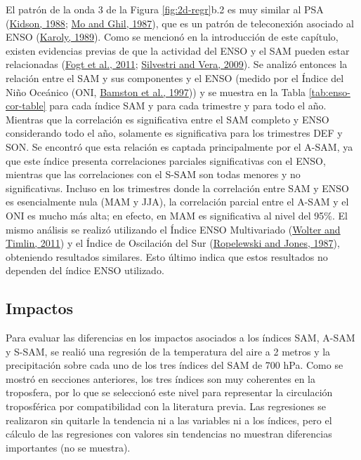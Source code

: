 \documentclass[12pt,oneside,a4paper]{reedthesis}
\begin{document}
El patrón de la onda 3 de la Figura \ref{fig:2d-regr}b.2 es muy similar al PSA (\protect\hyperlink{ref-kidson1988}{Kidson, 1988}; \protect\hyperlink{ref-mo1987}{Mo and Ghil, 1987}), que es un patrón de teleconexión asociado al ENSO (\protect\hyperlink{ref-karoly1989}{Karoly, 1989}).
Como se mencionó en la introducción de este capítulo, existen evidencias previas de que la actividad del ENSO y el SAM pueden estar relacionadas (\protect\hyperlink{ref-fogt2011a}{Fogt et al., 2011}; \protect\hyperlink{ref-silvestri2009}{Silvestri and Vera, 2009}).
Se analizó entonces la relación entre el SAM y sus componentes y el ENSO (medido por el Índice del Niño Oceánico (ONI, \protect\hyperlink{ref-bamston1997}{Bamston et al., 1997})) y se muestra en la Tabla \ref{tab:enso-cor-table} para cada índice SAM y para cada trimestre y para todo el año.
Mientras que la correlación es significativa entre el SAM completo y ENSO considerando todo el año, solamente es significativa para los trimestres DEF y SON.
Se encontró que esta relación es captada principalmente por el A-SAM, ya que este índice presenta correlaciones parciales significativas con el ENSO, mientras que las correlaciones con el S-SAM son todas menores y no significativas.
Incluso en los trimestres donde la correlación entre SAM y ENSO es esencialmente nula (MAM y JJA), la correlación parcial entre el A-SAM y el ONI es mucho más alta; en efecto, en MAM es significativa al nivel del 95\%.
El mismo análisis se realizó utilizando el Índice ENSO Multivariado (\protect\hyperlink{ref-wolter2011}{Wolter and Timlin, 2011}) y el Índice de Oscilación del Sur (\protect\hyperlink{ref-ropelewski1987}{Ropelewski and Jones, 1987}), obteniendo resultados similares.
Esto último indica que estos resultados no dependen del índice ENSO utilizado.

\hypertarget{impacts}{%
\subsection{Impactos}\label{impacts}}

Para evaluar las diferencias en los impactos asociados a los índices SAM, A-SAM y S-SAM, se realió una regresión de la temperatura del aire a 2 metros y la precipitación sobre cada uno de los tres índices del SAM de 700 hPa.
Como se mostró en secciones anteriores, los tres índices son muy coherentes en la troposfera, por lo que se seleccionó este nivel para representar la circulación troposférica por compatibilidad con la literatura previa.
Las regresiones se realizaron sin quitarle la tendencia ni a las variables ni a los índices, pero el cálculo de las regresiones con valores sin tendencias no muestran diferencias importantes (no se muestra).
\end{document}
